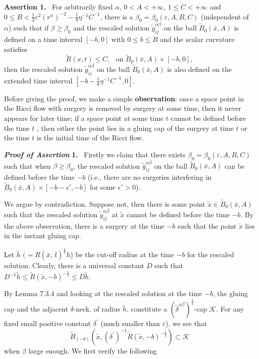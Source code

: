 \medskip
{\bf Assertion 1.} \ For arbitrarily fixed $\alpha$,
$0<A<+\infty$,  $1 \leq C<+\infty$ and $0 \leq B <
\frac{1}{2}\varepsilon^2(r^{\alpha})^{-2}-
\frac{1}{8}\eta^{-1}C^{-1}$, there is a
$\beta_0=\beta_0(\varepsilon, A, B, C)$ (independent of $\alpha$)
such that if $\beta\geq\beta_0$ and the rescaled solution
$\widetilde{g}^{\alpha\beta}_{ij}$ on the ball
$\widetilde{B}_{0}(\bar{x},A)$ is defined on a time interval
$[-b,0]$ with $0 \leq b \leq B$ and the scalar curvature satisfies
$$\widetilde{R}(x,t)\leq C , \ \ \mbox{ on }
\widetilde{B}_{0}(\bar{x},A) \times [-b,0],$$ then the rescaled
solution $\widetilde{g}^{\alpha\beta}_{ij}$ on the ball
$\widetilde{B}_{0}(\bar{x},A)$ is also defined on the extended
time interval $ [-b-\frac{1}{8}\eta^{-1}C^{-1},0]$.

\medskip
Before giving the proof, we make a simple \textbf{observation}:
once a space point in the Ricci flow with surgery is removed by
surgery at some time, then it never appears for later time; if a
space point at some time $t$ cannot be defined before the time $t$
, then either the point lies in a gluing cap of the surgery at
time $t$ or the time $t$ is the initial time of the Ricci flow.

\medskip
{\bf \em Proof of Assertion} {\bf 1.} \ Firstly we claim that
there exists $\beta_0=\beta_0( \varepsilon, A, B, C)$ such that
when $\beta\geq\beta_0$, the rescaled solution
$\widetilde{g}^{\alpha\beta}_{ij}$ on the ball
$\widetilde{B}_{0}(\bar{x},A)$ can be defined before the time $-b$
(i.e., there are no surgeries interfering in
$\widetilde{B}_{0}(\bar{x},A)\times [-b-\epsilon',-b]$ for some
$\epsilon'>0$).

We argue by contradiction. Suppose not, then there is some point
$\tilde{x}\in \widetilde{B}_{0}(\bar{x},A)$ such that the rescaled
solution $\widetilde{g}^{\alpha\beta}_{ij}$ at $\tilde{x}$ cannot
be defined before the time $-b$. By the above observation, there
is a surgery at the time $-b$ such that the point $\tilde{x}$ lies
in the instant gluing cap.

Let\; $\tilde{h}$\; $(=R(\bar{x},\,\bar{t})^{\frac{1}{2}}h$)\;
be\; the\; cut-off\; radius at the\; time\; $-b$\; for the
rescaled solution.  Clearly, there is a universal constant $D$
such that
${D}^{-1}\tilde{h}\leq\widetilde{R}(\tilde{x},-b)^{-\frac{1}{2}}\leq
D\tilde{h}$.

By Lemma 7.3.4 and looking at the rescaled solution at the time
$-b$, the gluing cap and the adjacent $\delta$-neck, of radius
$\tilde{h}$, constitute a
${(\widetilde{\delta}^{\alpha\beta})}^{\frac{1}{2}}$-cap
$\mathcal{K}$. For any fixed small positive constant
$\delta^{\prime}$ (much smaller than $\varepsilon$), we see that
$$
\widetilde{B}_{(-b)}(\tilde{x},{(\delta^{\prime})}^{-1}
\widetilde{R}(\tilde{x}, -b)^{-\frac{1}{2}})\subset\mathcal{K}
$$
when $\beta$ large enough.  We first verify the following

